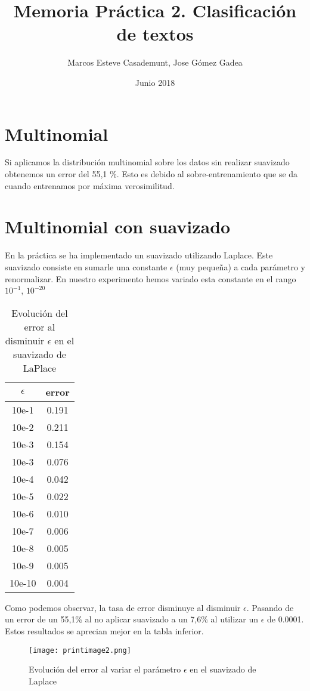 \documentclass[11pt,oneside,a4paper]{article}
\title{Memoria Práctica 2. Clasificación de textos}
\author{Marcos Esteve Casademunt, Jose Gómez Gadea}
\date{Junio 2018}
\begin{document}
\maketitle
\tableofcontents
\listoffigures

\section{Multinomial}
Si aplicamos la distribución multinomial sobre los datos sin realizar suavizado obtenemos un error del 55,1 \%. Esto es debido al sobre-entrenamiento que se da cuando entrenamos por máxima verosimilitud.
\section{Multinomial con suavizado}
En la práctica se ha implementado un suavizado utilizando Laplace. Este suavizado consiste en sumarle una constante $\epsilon$ (muy pequeña) a cada parámetro y renormalizar. En nuestro experimento hemos variado esta constante en el rango $10^{-1}$, $10^{-20}$
\begin{table}


\begin{center}
\begin{tabular}{|c c |}
\hline
$\epsilon$ & error \\
\hline
10e-1	 & 0.191 \\

10e-2   & 0.211 \\

10e-3 	 & 0.154 \\
10e-3 	  & 0.076 \\
10e-4 	 & 0.042 \\
10e-5 	  & 0.022 \\

10e-6 	  & 0.010 \\

10e-7 	 & 0.006 \\

10e-8 	& 0.005 \\

10e-9 	  & 0.005 \\

10e-10 	 & 0.004 \\
\hline
\end{tabular}

\end{center}
\caption{Evolución del error al disminuir $\epsilon$ en el suavizado de LaPlace}
\end{table}
Como podemos observar, la tasa de error disminuye al disminuir $\epsilon$. Pasando de un error de un 55,1\% al no aplicar suavizado a un 7,6\% al utilizar un $\epsilon$ de 0.0001. Estos resultados se aprecian mejor en la tabla inferior.
\begin{figure}
\texttt{[image: printimage2.png]}
\caption{Evolución del error al variar el parámetro $\epsilon$ en el suavizado de Laplace }
\end{figure}
\end{document}
